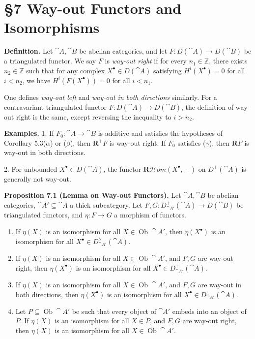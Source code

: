 \setcounter{page}{68}
\section{\S7 Way-out Functors and Isomorphisms}

\textbf{Definition.}
Let \(\cat{A},\cat{B}\) be abelian categories, and let \(F\colon D(\cat{A})\to D(\cat{B})\) be a triangulated functor.
We say \(F\) is \textit{way-out right} if for every \(n_1\in\mathbb{Z}\), there exists \(n_2\in\mathbb{Z}\) such that
for any complex \(X^\bullet\in D(\cat{A})\) satisfying \(H^i(X^\bullet)=0\) for all \(i<n_2\),
we have \(H^i(F(X^\bullet))=0\) for all \(i<n_1\).

One defines \textit{way-out left} and \textit{way-out in both directions} similarly.
For a contravariant triangulated functor \(F\colon D(\cat{A})\to D(\cat{B})\),
the definition of way-out right is the same, except reversing the inequality to \(i>n_2\).

\textbf{Examples.}
1. If \(F_0\colon\cat{A}\to\cat{B}\) is additive and satisfies the hypotheses of Corollary 5.3(\(\alpha\)) or (\(\beta\)),
then \(\mathbf{R}^+F\) is way-out right.
If \(F_0\) satisfies (\(\gamma\)), then \(\mathbf{R}F\) is way-out in both directions.

2. For unbounded \(X^\bullet\in D(\cat{A})\), the functor
\(\mathbf{R}\mathcal{H}\textit{om}(X^\bullet,\,\cdot\,)\) on \(D^+(\cat{A})\)
is generally not way-out.

\setcounter{page}{69}
\textbf{Proposition 7.1 (Lemma on Way-out Functors).}
Let \(\cat{A},\cat{B}\) be abelian categories, \(\cat{A}'\subseteq\cat{A}\) a thick subcategory.
Let \(F,G\colon D_{\cat{A}'}^+(\cat{A})\to D(\cat{B})\) be triangulated functors,
and \(\eta\colon F\to G\) a morphism of functors.
\begin{enumerate}
\item[(i)] If \(\eta(X)\) is an isomorphism for all \(X\in\operatorname{Ob}\cat{A}'\),
then \(\eta(X^\bullet)\) is an isomorphism for all \(X^\bullet\in D_{\cat{A}'}^b(\cat{A})\).

\item[(ii)] If \(\eta(X)\) is an isomorphism for all \(X\in\operatorname{Ob}\cat{A}'\),
and \(F,G\) are way-out right,
then \(\eta(X^\bullet)\) is an isomorphism for all \(X^\bullet\in D_{\cat{A}'}^+(\cat{A})\).

\item[(iii)] If \(\eta(X)\) is an isomorphism for all \(X\in\operatorname{Ob}\cat{A}'\),
and \(F,G\) are way-out in both directions,
then \(\eta(X^\bullet)\) is an isomorphism for all \(X^\bullet\in D_{\cat{A}'}(\cat{A})\).

\item[(iv)] Let \(P\subseteq\operatorname{Ob}\cat{A}'\) be such that every object of \(\cat{A}'\) embeds into an object of \(P\).
If \(\eta(X)\) is an isomorphism for all \(X\in P\), and \(F,G\) are way-out right,
then \(\eta(X)\) is an isomorphism for all \(X\in\operatorname{Ob}\cat{A}'\).
\end{enumerate}

